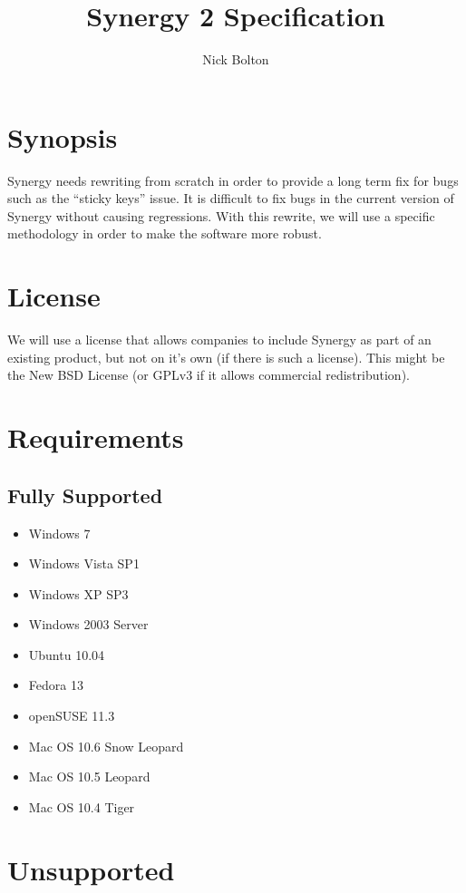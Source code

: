 \documentclass{article}
\title{Synergy 2 Specification}
\author{Nick Bolton}
\begin{document}
\maketitle

\section{Synopsis}

Synergy needs rewriting from scratch in order to provide a long term fix for 
bugs such as the ``sticky keys'' issue. It is difficult to fix bugs in the
current version of Synergy without causing regressions. With this rewrite, we
will use a specific methodology in order to make the software more robust.

\section{License}

We will use a license that allows companies to include Synergy as part of an 
existing product, but not on it's own (if there is such a license). This might
be the New BSD License (or GPLv3 if it allows commercial redistribution).

\section{Requirements}

\subsection{Fully Supported}

\begin{itemize}
  \item Windows 7
  \item Windows Vista SP1
  \item Windows XP SP3
  \item Windows 2003 Server
  \item Ubuntu 10.04
  \item Fedora 13
  \item openSUSE 11.3
  \item Mac OS 10.6 Snow Leopard
  \item Mac OS 10.5 Leopard
  \item Mac OS 10.4 Tiger
\end{itemize}

\section{Unsupported}
\end{document}
